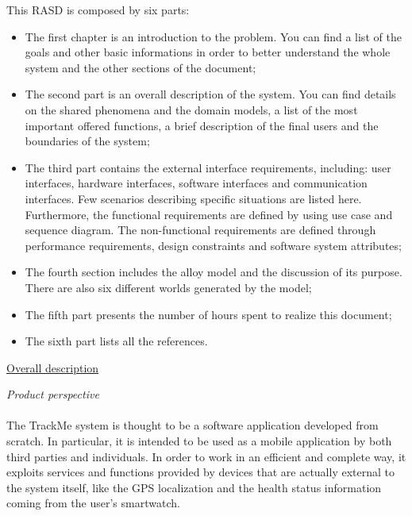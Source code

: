 \documentclass{article}
\begin{document}
\begin{legal}
		{\normalfont
This RASD is composed by six parts:
		\begin{itemize}
		\item The first chapter is an introduction to the problem. You can find a list of the goals and other basic informations in order to better understand the whole system and the other sections of the document;\\
		\item The second part is an overall description of the system. You can find details on the shared phenomena and the domain models, a list of the most important offered functions, a brief description of the final users and the boundaries of the system;\\
		\item The third part contains the external interface requirements, including: user interfaces, hardware interfaces, software interfaces and communication interfaces. Few scenarios describing specific situations are listed here. Furthermore, the functional requirements are defined by using use case and sequence diagram. The non-functional requirements are defined through performance requirements, design constraints and software system attributes;\\
		\item The fourth section includes the alloy model and the discussion of its purpose. There are also six different worlds generated by the model;\\
		\item The fifth part presents the number of hours spent to realize this document;\\
		\item The sixth part lists all the references.\\
		\end{itemize}
		}		
  	\item \underline{Overall description}
  		\begin{legal}
    		\item \textit{Product perspective}\\\\
			{\normalfont
The TrackMe system is thought to be a software application developed from scratch. In particular, it is intended to be used as a mobile application by both third parties and individuals.
In order to work in an efficient and complete way, it exploits services and functions provided by devices that are actually external to the system itself, like the GPS 				localization and the health status information coming from the user’s smartwatch.
}
\end{legal}
\end{legal}
\end{document}
